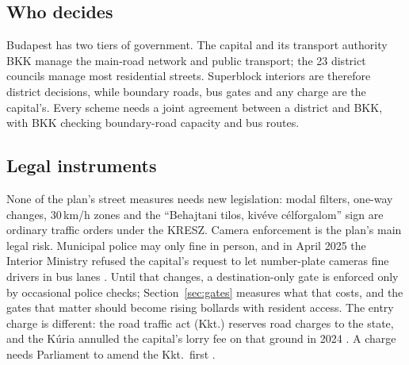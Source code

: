 \documentclass[11pt,a4paper]{article}
\begin{document}
\subsection{Who decides}
Budapest has two tiers of government. The capital and its transport authority BKK manage the main-road network and public transport; the 23 district councils manage most residential streets. Superblock interiors are therefore district decisions, while boundary roads, bus gates and any charge are the capital's. Every scheme needs a joint agreement between a district and BKK, with BKK checking boundary-road capacity and bus routes.

\subsection{Legal instruments}
None of the plan's street measures needs new legislation: modal filters, one-way changes, 30\,km/h zones and the ``Behajtani tilos, kivéve célforgalom'' sign are ordinary traffic orders under the KRESZ. Camera enforcement is the plan's main legal risk. Municipal police may only fine in person, and in April 2025 the Interior Ministry refused the capital's request to let number-plate cameras fine drivers in bus lanes \citep{xpatloop2025}. Until that changes, a destination-only gate is enforced only by occasional police checks; Section~\ref{sec:gates} measures what that costs, and the gates that matter should become rising bollards with resident access. The entry charge is different: the road traffic act (Kkt.) reserves road charges to the state, and the Kúria annulled the capital's lorry fee on that ground in 2024 \citep{kuria2024}. A charge needs Parliament to amend the Kkt.\ first \citep{vg2026}.
\end{document}
